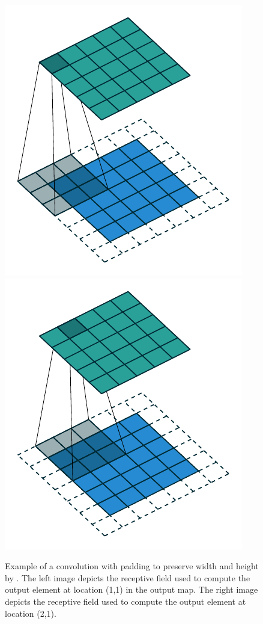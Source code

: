 \begin{figure}
\centering
    \includegraphics{graphics/same_padding_no_strides_00.pdf}
    \includegraphics{graphics/same_padding_no_strides_01.pdf}
    \caption{Example of a convolution with padding to preserve width and height by \citet{dumoulin2016guide}. The left image depicts the receptive field used to compute the output element at location (1,1) in the output map. The right image depicts the receptive field used to compute the output element at location (2,1).}
    \label{fig:convolution}
\end{figure}

